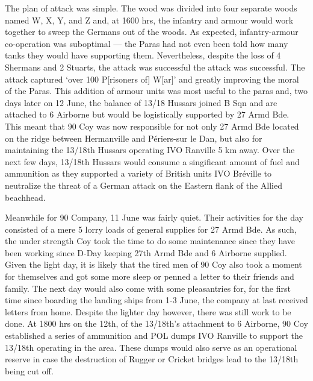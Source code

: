 \documentclass[noraggedright]{turabian-researchpaper}
\begin{document}
The plan of attack was simple.  The wood was divided into four separate woods 
named W, X, Y, and Z and, at 1600 hrs, the infantry and armour would work 
together to sweep the Germans out of the woods.  As expected, infantry-armour
co-operation was suboptimal --- the Paras had not even been told how many 
tanks they would have supporting them.\autocite[June 1944, Appendix 2, p 2]
{7parawd}  Nevertheless, despite the loss of 4 Shermans and 2 Stuarts,
the attack was successful the attack was successful.  The attack captured
`over 100 P[risoners of] W[ar]' and greatly improving the moral of 
the Paras.\autocite[10 June 1944]{1318wd}  This addition of armour units 
was most useful to the paras and, two days later on 12 June, the balance of 
13/18 Hussars joined B Sqn and are attached to 6 Airborne but would be 
logistically supported by 27 Armd Bde.  This meant that 90 Coy was now 
responsible for not only 27 Armd Bde located on the ridge between Hermanville 
and Périers-sur le Dan, but also for maintaining the 13/18th Hussars 
operating IVO Ranville 5 km away.    Over the next few days, 13/18th 
Hussars would consume a singificant amount of fuel and ammunition as they
supported a variety of British units IVO Bréville to neutralize the 
threat of a German attack on the Eastern flank of the Allied beachhead.

Meanwhile for 90 Company, 11 June was fairly quiet.  Their activities for the
day consisted of a mere 5 lorry loads of general supplies for 27 Armd
Bde.  As such, the under strength Coy took the time to do some maintenance 
since they have been working since D-Day keeping 27th Armd Bde and 6 Airborne
supplied.\autocite[11 June 1944]{90wd}  Given the light day, it is likely that
the tired men of 90 Coy also took a moment for themselves and got some more 
sleep or penned a letter to their friends and family.  The next day would also 
come with some pleasantries for, for the first time since boarding the landing 
ships from 1-3 June, the company at last received letters from 
home.\autocite[12 June 1944]{90wd} %
Despite the lighter day however, there was still work to be done. At 1800 hrs
on the 12th, of the 13/18th's attachment to 6 Airborne, 90 Coy established a 
series of ammunition and POL dumps IVO Ranville to support the 13/18th 
operating in the area.  These dumps would also serve as an 
operational reserve in case the destruction of Rugger or Cricket bridges
lead to the 13/18th being cut off.\autocite[12 June 1944]{90wd}  
\end{document}
